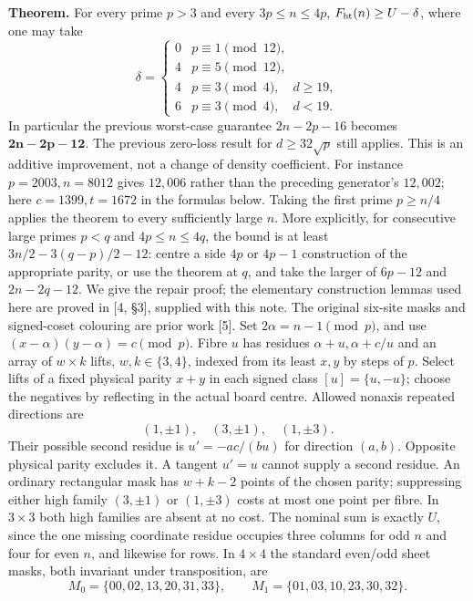 \documentclass[10pt]{article}
\begin{document}
\textbf{Theorem.} For every prime $p>3$ and every $3p\le n\le4p$, $F_{\rm ht}(n)\ge U-\delta$, where one may take
\[
\delta=\begin{cases}0 & p\equiv1\pmod{12},\\4 & p\equiv5\pmod{12},\\4 & p\equiv3\pmod4,\quad d\ge19,\\6 & p\equiv3\pmod4,\quad d<19.\end{cases}
\]
In particular the previous worst-case guarantee $2n-2p-16$ becomes $\mathbf{2n-2p-12}$. The previous zero-loss result for $d\ge32\sqrt p$ still applies. This is an additive improvement, not a change of density coefficient. For instance $p=2003,n=8012$ gives $12,006$ rather than the preceding generator's $12,002$; here $c=1399,t=1672$ in the formulas below. Taking the first prime $p\ge n/4$ applies the theorem to every sufficiently large $n$. More explicitly, for consecutive large primes $p<q$ and $4p\le n\le4q$, the bound is at least $3n/2-3(q-p)/2-12$: centre a side $4p$ or $4p-1$ construction of the appropriate parity, or use the theorem at $q$, and take the larger of $6p-12$ and $2n-2q-12$.
We give the repair proof; the elementary construction lemmas used here are proved in [4, \S3], supplied with this note. The original six-site masks and signed-coset colouring are prior work [5]. Set $2\alpha=n-1\pmod p$, and use $(x-\alpha)(y-\alpha)=c\pmod p$. Fibre $u$ has residues $\alpha+u,\alpha+c/u$ and an array of $w\times k$ lifts, $w,k\in\{3,4\}$, indexed from its least $x,y$ by steps of $p$. Select lifts of a fixed physical parity $x+y$ in each signed class $[u]=\{u,-u\}$; choose the negatives by reflecting in the actual board centre. Allowed nonaxis repeated directions are
\[
 (1,\pm1),\quad (3,\pm1),\quad (1,\pm3).
\]
Their possible second residue is $u'=-ac/(bu)$ for direction $(a,b)$. Opposite physical parity excludes it. A tangent $u'=u$ cannot supply a second residue. An ordinary rectangular mask has $w+k-2$ points of the chosen parity; suppressing either high family $(3,\pm1)$ or $(1,\pm3)$ costs at most one point per fibre. In $3\times3$ both high families are absent at no cost. The nominal sum is exactly $U$, since the one missing coordinate residue occupies three columns for odd $n$ and four for even $n$, and likewise for rows. In $4\times4$ the standard even/odd sheet masks, both invariant under transposition, are
\[
 M_0=\{00,02,13,20,31,33\},\qquad M_1=\{01,03,10,23,30,32\}.
\]
\end{document}
